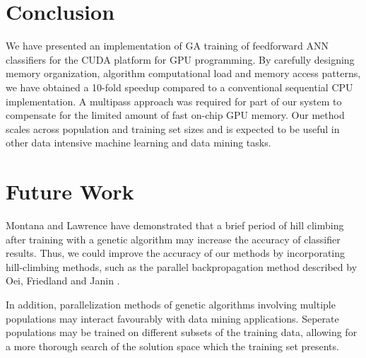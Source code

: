\documentclass[letterpaper]{jpconf}       %
\begin{document}
\section{Conclusion} \label{concl}
We have presented an implementation of GA training of feedforward ANN classifiers for the CUDA platform for GPU programming. By carefully designing memory organization, algorithm computational load and memory access patterns, we have obtained a 10-fold speedup compared to a conventional sequential CPU implementation. A multipass approach was required for part of our system to compensate for the limited amount of fast on-chip GPU memory. Our method scales across population and training set sizes and is expected to be useful in other data intensive machine learning and data mining tasks.

\section{Future Work} \label{future}
Montana and Lawrence \cite{GA-ANN} have demonstrated that a brief period of hill climbing after training with a genetic algorithm may increase the accuracy of classifier results. Thus, we could improve the accuracy of our methods by incorporating hill-climbing methods, such as the parallel backpropagation method described by Oei, Friedland and Janin \cite{backprop}.

In addition, parallelization methods of genetic algorithms involving multiple populations \cite{Alba1999} may interact favourably with data mining applications.  Seperate populations may be trained on different subsets of the training data, allowing for a more thorough search of the solution space which the training set presents.\\



\end{document}
